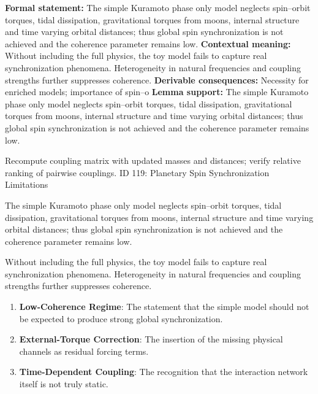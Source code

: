 \begingroup\footnotesize\setlength{\emergencystretch}{3em}\sloppy
\textbf{Formal statement:} The simple Kuramoto phase only model neglects spin--orbit torques, tidal dissipation, gravitational torques from moons, internal structure and time varying orbital distances; thus global spin synchronization is not achieved and the coherence parameter remains low.
\textbf{Contextual meaning:} Without including the full physics, the toy model fails to capture real synchronization phenomena. Heterogeneity in natural frequencies and coupling strengths further suppresses coherence.
\textbf{Derivable consequences:} Necessity for enriched models; importance of spin--o
\textbf{Lemma support:} The simple Kuramoto phase only model neglects spin--orbit torques, tidal dissipation, gravitational torques from moons, internal structure and time varying orbital distances; thus global spin synchronization is not achieved and the coherence parameter remains low.\par
\endgroup

Recompute coupling matrix with updated masses and distances; verify relative ranking of pairwise couplings. ID 119: Planetary Spin Synchronization Limitations

The simple Kuramoto phase only model neglects spin--orbit torques, tidal dissipation, gravitational torques from moons, internal structure and time varying orbital distances; thus global spin synchronization is not achieved and the coherence parameter remains low.

Without including the full physics, the toy model fails to capture real synchronization phenomena. Heterogeneity in natural frequencies and coupling strengths further suppresses coherence.
\endgroup

\begin{enumerate}[leftmargin=1.6em,itemsep=6pt,topsep=4pt]
\item \textbf{Low-Coherence Regime}: The statement that the simple model should not be expected to produce strong global synchronization.
\item \textbf{External-Torque Correction}: The insertion of the missing physical channels as residual forcing terms.
\item \textbf{Time-Dependent Coupling}: The recognition that the interaction network itself is not truly static.
\end{enumerate}

